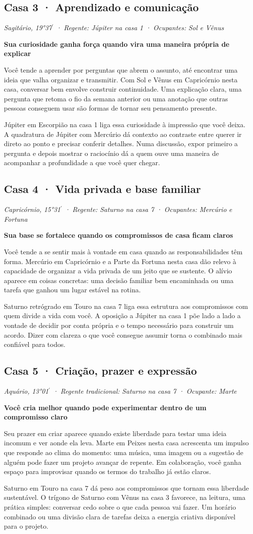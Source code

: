 \documentclass[11pt,a4paper]{article}
\newcommand{\leitura}[3]{\subsection{#1}\textit{#2}\par #3}
\newcommand{\subtituloleitura}[1]{\textbf{#1}\par\nopagebreak[4]}
\begin{document}
\leitura{Casa 3 · Aprendizado e comunicação}{Sagitário, 19°37\ensuremath{^{\prime}} · Regente: Júpiter na casa 1 · Ocupantes: Sol e Vênus}{
\subtituloleitura{Sua curiosidade ganha força quando vira uma maneira própria de explicar}
Você tende a aprender por perguntas que abrem o assunto, até encontrar uma ideia que valha organizar e transmitir. Com Sol e Vênus em Capricórnio nesta casa, conversar bem envolve construir continuidade. Uma explicação clara, uma pergunta que retoma o fio da semana anterior ou uma anotação que outras pessoas conseguem usar são formas de tornar seu pensamento presente.

Júpiter em Escorpião na casa 1 liga essa curiosidade à impressão que você deixa. A quadratura de Júpiter com Mercúrio dá contexto ao contraste entre querer ir direto ao ponto e precisar conferir detalhes. Numa discussão, expor primeiro a pergunta e depois mostrar o raciocínio dá a quem ouve uma maneira de acompanhar a profundidade a que você quer chegar.
}

\leitura{Casa 4 · Vida privada e base familiar}{Capricórnio, 15°31\ensuremath{^{\prime}} · Regente: Saturno na casa 7 · Ocupantes: Mercúrio e Fortuna}{
\subtituloleitura{Sua base se fortalece quando os compromissos de casa ficam claros}
Você tende a se sentir mais à vontade em casa quando as responsabilidades têm forma. Mercúrio em Capricórnio e a Parte da Fortuna nesta casa dão relevo à capacidade de organizar a vida privada de um jeito que se sustente. O alívio aparece em coisas concretas: uma decisão familiar bem encaminhada ou uma tarefa que ganhou um lugar estável na rotina.

Saturno retrógrado em Touro na casa 7 liga essa estrutura aos compromissos com quem divide a vida com você. A oposição a Júpiter na casa 1 põe lado a lado a vontade de decidir por conta própria e o tempo necessário para construir um acordo. Dizer com clareza o que você consegue assumir torna o combinado mais confiável para todos.
}

\leitura{Casa 5 · Criação, prazer e expressão}{Aquário, 13°01\ensuremath{^{\prime}} · Regente tradicional: Saturno na casa 7 · Ocupante: Marte}{
\subtituloleitura{Você cria melhor quando pode experimentar dentro de um compromisso claro}
Seu prazer em criar aparece quando existe liberdade para testar uma ideia incomum e ver aonde ela leva. Marte em Peixes nesta casa acrescenta um impulso que responde ao clima do momento: uma música, uma imagem ou a sugestão de alguém pode fazer um projeto avançar de repente. Em colaboração, você ganha espaço para improvisar quando os termos do trabalho já estão claros.

Saturno em Touro na casa 7 dá peso aos compromissos que tornam essa liberdade sustentável. O trígono de Saturno com Vênus na casa 3 favorece, na leitura, uma prática simples: conversar cedo sobre o que cada pessoa vai fazer. Um horário combinado ou uma divisão clara de tarefas deixa a energia criativa disponível para o projeto.
}
\end{document}
